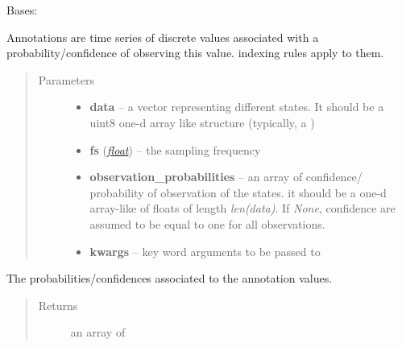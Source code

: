 \documentclass[letterpaper,10pt,english]{sphinxmanual}
\begin{document}
\begin{fulllineitems}
\label{pyrem.time_series:pyrem.time_series.Annotation}
Bases: {\hyperref[pyrem.time_series:pyrem.time_series.BiologicalTimeSeries]{}}

Annotations are time series of discrete values associated with a probability/confidence of observing this value.
{\hyperref[pyrem.time_series:pyrem.time_series.BiologicalTimeSeries]{}} indexing rules apply to them.
\begin{quote}\begin{description}
\item[{Parameters}] \leavevmode\begin{itemize}
\item {} 
\textbf{data} -- a vector representing different states.            It should be a uint8 one-d array like structure (typically, a \href{http://docs.scipy.org/doc/numpy/reference/generated/numpy.ndarray.html\#numpy.ndarray}{})

\item {} 
\textbf{fs} (\href{http://docs.python.org/2.7/library/functions.html\#float}{\emph{float}}) -- the sampling frequency

\item {} 
\textbf{observation\_probabilities} -- an array of confidence/ probability of observation of the states.
it should be a one-d array-like of floats of length \emph{len(data)}.
If \emph{None}, confidence are assumed to be equal to one for all observations.

\item {} 
\textbf{kwargs} -- key word arguments to be passed to {\hyperref[pyrem.time_series:pyrem.time_series.BiologicalTimeSeries]{}}

\end{itemize}

\end{description}\end{quote}

\begin{fulllineitems}
\label{pyrem.time_series:pyrem.time_series.Annotation.probas}
The probabilities/confidences associated to the annotation values.
\begin{quote}\begin{description}
\item[{Returns}] \leavevmode
an array of 


\end{description}
\end{quote}
\end{fulllineitems}
\end{fulllineitems}
\end{document}
